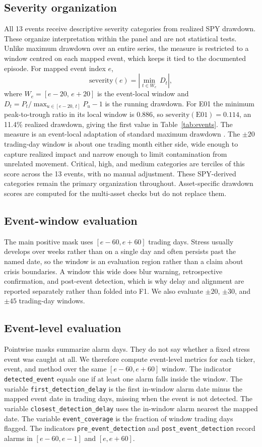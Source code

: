 \documentclass[pdflatex,sn-mathphys-num,iicol]{sn-jnl}
\begin{document}
\subsection{Severity organization}
All 13 events receive descriptive severity categories from realized SPY drawdown. These organize interpretation within the panel and are not statistical tests. Unlike maximum drawdown over an entire series, the measure is restricted to a window centred on each mapped event, which keeps it tied to the documented episode. For mapped event index $e$,
\begin{equation}
\mathrm{severity}(e)=\left|\min_{t\in W_e}\,D_t\right| ,
\end{equation}
where $W_e=[e-20,\,e+20]$ is the event-local window and $D_t=P_t/\max_{u\in[e-20,\,t]}P_u-1$ is the running drawdown.
For E01 the minimum peak-to-trough ratio in its local window is $0.886$, so $\mathrm{severity}(\mathrm{E01})=0.114$, an 11.4\% realized drawdown, giving the first value in Table~\ref{tab:events}. The measure is an event-local adaptation of standard maximum drawdown \cite{magdon2004}. The $\pm20$ trading-day window is about one trading month either side, wide enough to capture realized impact and narrow enough to limit contamination from unrelated movement. Critical, high, and medium categories are terciles of this score across the 13 events, with no manual adjustment. These SPY-derived categories remain the primary organization throughout. Asset-specific drawdown scores are computed for the multi-asset checks but do not replace them.

\subsection{Event-window evaluation}
The main positive mask uses $[e-60,e+60]$ trading days. Stress usually develops over weeks rather than on a single day and often persists past the named date, so the window is an evaluation region rather than a claim about crisis boundaries. A window this wide does blur warning, retrospective confirmation, and post-event detection, which is why delay and alignment are reported separately rather than folded into F1. We also evaluate $\pm20$, $\pm30$, and $\pm45$ trading-day windows.

\subsection{Event-level evaluation}
Pointwise masks summarize alarm days. They do not say whether a fixed stress event was caught at all. We therefore compute event-level metrics for each ticker, event, and method over the same $[e-60,e+60]$ window. The indicator \texttt{detected\_event} equals one if at least one alarm falls inside the window. The variable \texttt{first\_detection\_delay} is the first in-window alarm date minus the mapped event date in trading days, missing when the event is not detected. The variable \texttt{closest\_detection\_delay} uses the in-window alarm nearest the mapped date. The variable \texttt{event\_coverage} is the fraction of window trading days flagged. The indicators \texttt{pre\_event\_detection} and \texttt{post\_event\_detection} record alarms in $[e-60,e-1]$ and $[e,e+60]$.
\end{document}
